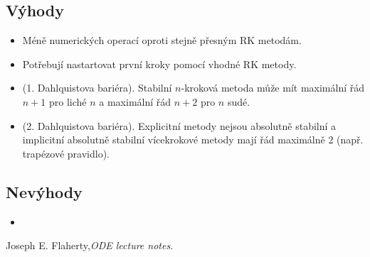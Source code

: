 \documentclass[a4paper, 12pt]{book}
\theoremstyle{definition}
\begin{document}
\subsection{Výhody}
\begin{itemize}
 \item Méně numerických operací oproti stejně přesným RK metodám.
 \item Potřebují nastartovat první kroky pomocí vhodné RK metody.
 \item (1. Dahlquistova bariéra). Stabilní $n$-kroková metoda může mít maximální řád $n+1$ pro liché $n$ a maximální řád $n+2$  pro $n$ sudé.  
 \item (2. Dahlquistova bariéra). Explicitní metody nejsou absolutně stabilní a implicitní absolutně stabilní vícekrokové metody mají řád maximálně 2 (např. trapézové pravidlo).
\
\end{itemize}

\subsection{Nevýhody}
\begin{itemize}
 \item 
\end{itemize}
















\begin{thebibliography}{9}

  Joseph E. Flaherty,\emph{ODE lecture notes}.
\end{thebibliography}
\end{document}
